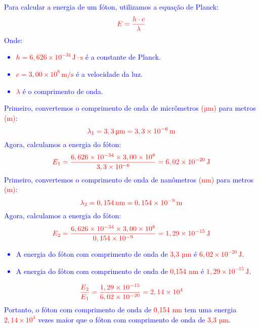 \documentclass[a4paper, 12pt]{article}
\begin{document}
\begin{enumerate}
	      \textcolor{blue}{
		      Para calcular a energia de um fóton, utilizamos a equação de Planck:
		      \[
			      \textcolor{red}{E = \frac{h \cdot c}{\lambda}}
		      \]
		      Onde:
		      \begin{itemize}
			      \item[] \textcolor{red}{\(h = 6,626 \times 10^{-34} \, \text{J} \cdot \text{s}\)} é a constante de Planck.
			      \item[] \textcolor{red}{\(c = 3,00 \times 10^8 \, \text{m/s}\)} é a velocidade da luz.
			      \item[] \textcolor{red}{\(\lambda\)} é o comprimento de onda.
		      \end{itemize}
		      Primeiro, convertemos o comprimento de onda de micrômetros \textcolor{red}{(µm)} para metros \textcolor{red}{(m)}:
		      \[
			      \textcolor{red}{\lambda_1 = 3,3 \, \text{µm} = 3,3 \times 10^{-6} \, \text{m}}
		      \]
		      Agora, calculamos a energia do fóton:
		      \[
			      \textcolor{red}{E_1 = \frac{6,626 \times 10^{-34} \times 3,00 \times 10^8}{3,3 \times 10^{-6}} = 6,02 \times 10^{-20} \, \text{J}}
		      \]
		      Primeiro, convertemos o comprimento de onda de nanômetros \textcolor{red}{(nm)} para metros \textcolor{red}{(m)}:
		      \[
			      \textcolor{red}{\lambda_2 = 0,154 \, \text{nm} = 0,154 \times 10^{-9} \, \text{m}}
		      \]
		      Agora, calculamos a energia do fóton:
		      \[
			      \textcolor{red}{E_2 = \frac{6,626 \times 10^{-34} \times 3,00 \times 10^8}{0,154 \times 10^{-9}} = 1,29 \times 10^{-15} \, \text{J}}
		      \]
		      \begin{itemize}
			      \item[] A energia do fóton com comprimento de onda de \textcolor{red}{3,3 µm} é \textcolor{red}{\(6,02 \times 10^{-20} \, \text{J}\)}.
			      \item[] A energia do fóton com comprimento de onda de \textcolor{red}{0,154 nm} é \textcolor{red}{\(1,29 \times 10^{-15} \, \text{J}\)}.
		      \end{itemize}
		      \[
			      \textcolor{red}{\frac{E_2}{E_1} = \frac{1,29 \times 10^{-15}}{6,02 \times 10^{-20}} = 2,14 \times 10^4}
		      \]
		      Portanto, o fóton com comprimento de onda de \textcolor{red}{0,154 nm} tem uma energia \textcolor{red}{\(2,14 \times 10^4\)} vezes maior que o fóton com comprimento de onda de \textcolor{red}{3,3 µm}.
	      }
	      \pagebreak
	      

\end{enumerate}
\end{document}
